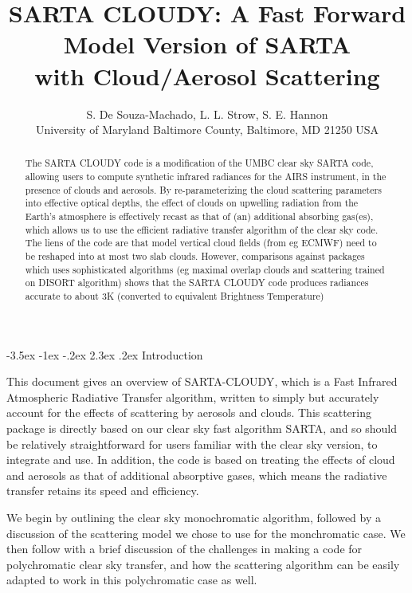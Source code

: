 \documentclass[11pt]{article}
\title{\textsf{SARTA CLOUDY}: A Fast Forward Model Version of
  \textsf{SARTA}\\ with Cloud/Aerosol Scattering}
\author{S. De Souza-Machado, L. L. Strow, S. E. Hannon \\
      University of Maryland Baltimore County, Baltimore, MD 21250 USA}
\makeatletter
\newcommand{\sa}{\textsf{SARTA}\xspace}
\newcommand{\sasc}{\textsf{SARTA-CLOUDY}\xspace}
\renewcommand{\section}{\@startsection {section}{1}{\z@}%
                                   {-3.5ex \@plus -1ex \@minus -.2ex}%
                                   {2.3ex \@plus.2ex}%
                                   {\reset@font\large\bfseries}}
\makeatother
\begin{document}
\maketitle

\begin{abstract}

The \textsf{SARTA CLOUDY} code is a modification of the UMBC clear sky \textsf{SARTA} code, allowing users to compute 
synthetic infrared radiances for the AIRS instrument, in the presence of clouds and aerosols. By re-parameterizing the
cloud scattering parameters into effective optical depths, the effect of clouds on upwelling radiation from
the Earth's atmosphere is effectively recast as that of (an) additional absorbing gas(es), which allows us to use 
the efficient radiative transfer algorithm of the clear sky code. The liens of the code are that model vertical cloud
fields (from eg ECMWF) need to be reshaped into at most two slab clouds. However, comparisons against packages 
which uses sophisticated algorithms (eg maximal overlap clouds and scattering trained on DISORT algorithm) shows that
the \textsf{SARTA CLOUDY} code produces radiances accurate to about 3K (converted to equivalent Brightness Temperature)

\end{abstract}

\section{Introduction}

This document gives an overview of \sasc, which is a Fast Infrared Atmospheric Radiative Transfer algorithm,
written to simply but accurately account for the effects of scattering by aerosols and clouds. This scattering package is 
directly based on our clear sky fast algorithm \sa, and so should be relatively straightforward for users familiar with 
the clear sky version, to integrate and use. In addition, the code is based on treating the effects of cloud and aerosols 
as that of additional absorptive gases, which means the radiative transfer retains its speed and efficiency. 

We begin by outlining the clear sky monochromatic algorithm, followed by a discussion of the scattering model we
chose to use for the monchromatic case. We then follow with a brief discussion of the challenges in making a code
for polychromatic clear sky transfer, and how the scattering algorithm can be easily adapted to work in this
polychromatic case as well.
\end{document}
